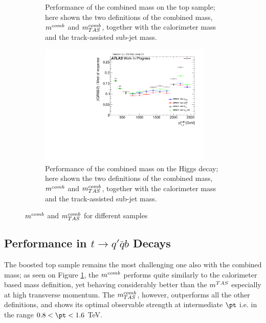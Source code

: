\begin{figure}
\begin{subfigure}[b]{0.45\textwidth}
  \caption[$\mcombtas$ on the boosted tops]{Performance of the combined mass on the top sample; here shown the two definitions of the combined mass, $m^{comb}$ and $\mcombtas$, together with the calorimeter mass and the track-assisted sub-jet mass.}
  \label{fig:mcombtas4}
    \end{subfigure}
    \begin{subfigure}[b]{0.45\textwidth}
  \centering
      \includegraphics[width=0.9\textwidth]{jet_part/mcomb/mcombtas5.pdf}
  \caption[$\mcombtas$ on the boosted Higgs]{Performance of the combined mass on the Higgs decay; here shown the two definitions of the combined mass, $m^{comb}$ and $\mcombtas$, together with the calorimeter mass and the track-assisted sub-jet mass.}
  \label{fig:mcombtas5}
    \end{subfigure}
\caption{$m^{comb}$ and $\mcombtas$ for different samples}
\end{figure}

\subsection{Performance in $t\to q'\bar{q}b$ Decays}
The boosted top sample remains the most challenging one also with the combined mass; as seen on Figure \ref{fig:mcombtas4}, the $m^{comb}$ performs quite similarly to the calorimeter based mass definition, yet behaving considerably better than the $m^{TAS}$ especially at high transverse momentum. The $\mcombtas$, however, outperforms all the other definitions, and shows its optimal observable strength at intermediate $\pt$ i.e. in the range $0.8 < \pt < 1.6$ TeV.



